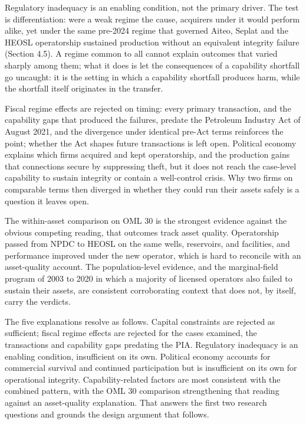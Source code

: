 \documentclass[twoside,fontset=lmodern]{mitthesis}
\begin{document}
Regulatory inadequacy is an enabling condition, not the primary driver.
The test is differentiation: were a weak regime the cause, acquirers
under it would perform alike, yet under the same pre-2024 regime that
governed Aiteo, Seplat and the HEOSL operatorship sustained production
without an equivalent integrity failure (Section 4.5). A regime common
to all cannot explain outcomes that varied sharply among them; what it
does is let the consequences of a capability shortfall go uncaught: it
is the setting in which a capability shortfall produces harm, while the
shortfall itself originates in the transfer.

Fiscal regime effects are rejected on timing: every primary transaction,
and the capability gaps that produced the failures, predate the
Petroleum Industry Act of August 2021, and the divergence under
identical pre-Act terms reinforces the point; whether the Act shapes
future transactions is left open. Political economy explains which firms
acquired and kept operatorship, and the production gains that
connections secure by suppressing theft, but it does not reach the
case-level capability to sustain integrity or contain a well-control
crisis. Why two firms on comparable terms then diverged in whether they
could run their assets safely is a question it leaves open.

The within-asset comparison on OML 30 is the strongest evidence against
the obvious competing reading, that outcomes track asset quality.
Operatorship passed from NPDC to HEOSL on the same wells, reservoirs,
and facilities, and performance improved under the new operator, which
is hard to reconcile with an asset-quality account. The population-level
evidence, and the marginal-field program of 2003 to 2020 in which a
majority of licensed operators also failed to sustain their assets, are
consistent corroborating context that does not, by itself, carry the
verdicts.

The five explanations resolve as follows. Capital constraints are
rejected as sufficient; fiscal regime effects are rejected for the cases
examined, the transactions and capability gaps predating the PIA.
Regulatory inadequacy is an enabling condition, insufficient on its own.
Political economy accounts for commercial survival and continued
participation but is insufficient on its own for operational integrity.
Capability-related factors are most consistent with the combined
pattern, with the OML 30 comparison strengthening that reading against
an asset-quality explanation. That answers the first two research
questions and grounds the design argument that follows.
\end{document}
